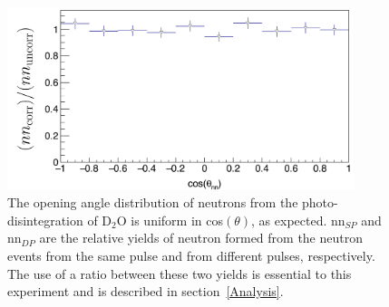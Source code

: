 \begin{figure}[h]
\includegraphics[width=0.9\textwidth]{Content/Methods/D2Otheta_nn.png}
\caption{The opening angle distribution of neutrons from the photo-disintegration of D$_{2}$O  is uniform in cos$(\theta)$, as expected. 
nn$_{SP}$ and nn$_{DP}$ are the relative yields of neutron formed from the neutron events from the same pulse and from different pulses, respectively. 
 The use of a ratio between these two yields is essential to this experiment and is described in section~\ref{Analysis}.}
\label{fig:D2Otheta_nn}
\end{figure}

\FloatBarrier
